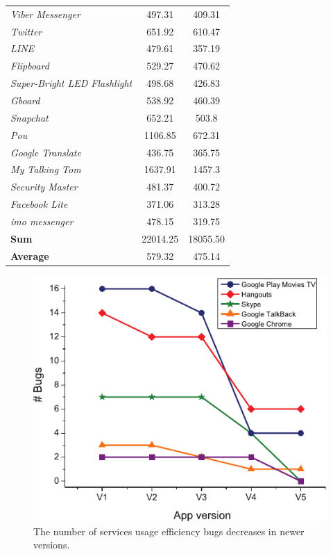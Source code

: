 \documentclass[conference]{IEEEtran}
\begin{document}
\begin{table}
\begin{tabular}{|l|cc|}
{\it Viber Messenger}&497.31&409.31\\
{\it Twitter}&651.92&610.47\\
{\it LINE}&479.61&357.19\\
{\it Flipboard}&529.27&470.62\\
{\it Super-Bright LED Flashlight}&498.68&426.83\\
{\it Gboard}&538.92&460.39\\
{\it Snapchat}&652.21&503.8\\
{\it Pou}&1106.85&672.31\\
{\it Google Translate}&436.75&365.75\\
{\it My Talking Tom}&1637.91&1457.3\\
{\it Security Master}&481.37&400.72\\
{\it Facebook Lite}&371.06&313.28\\
{\it imo messenger}&478.15&319.75\\
\hline
{\bf Sum}&22014.25&18055.50\\
\hline
{\bf Average}&579.32&475.14\\
\hline
\end{tabular}
\label{tab_energy}
\end{table}



 \begin{figure}
 \centering
  \includegraphics[scale=1.0]{bugs-vs-versions.pdf}
 \caption{The number of services usage efficiency bugs decreases in newer versions.}
\label{fig_bugsvsversions}
\end{figure}
\end{document}

